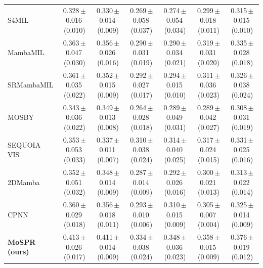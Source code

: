 \begin{tabular}{lcccccc}
S4MIL & 0.328\,{\tiny$\pm$}0.016\,{\tiny(0.010)} & 0.330\,{\tiny$\pm$}0.014\,{\tiny(0.009)} & 0.269\,{\tiny$\pm$}0.058\,{\tiny(0.037)} & 0.274\,{\tiny$\pm$}0.054\,{\tiny(0.034)} & 0.299\,{\tiny$\pm$}0.018\,{\tiny(0.011)} & 0.315\,{\tiny$\pm$}0.015\,{\tiny(0.010)}\\
MambaMIL & 0.363\,{\tiny$\pm$}0.047\,{\tiny(0.030)} & 0.356\,{\tiny$\pm$}0.026\,{\tiny(0.016)} & 0.290\,{\tiny$\pm$}0.031\,{\tiny(0.019)} & 0.290\,{\tiny$\pm$}0.034\,{\tiny(0.021)} & 0.319\,{\tiny$\pm$}0.031\,{\tiny(0.020)} & 0.335\,{\tiny$\pm$}0.028\,{\tiny(0.018)}\\
SRMambaMIL & 0.361\,{\tiny$\pm$}0.035\,{\tiny(0.022)} & 0.352\,{\tiny$\pm$}0.015\,{\tiny(0.009)} & 0.292\,{\tiny$\pm$}0.027\,{\tiny(0.017)} & 0.294\,{\tiny$\pm$}0.015\,{\tiny(0.010)} & 0.311\,{\tiny$\pm$}0.036\,{\tiny(0.023)} & 0.326\,{\tiny$\pm$}0.038\,{\tiny(0.024)}\\
MOSBY & 0.343\,{\tiny$\pm$}0.036\,{\tiny(0.022)} & 0.349\,{\tiny$\pm$}0.013\,{\tiny(0.008)} & 0.264\,{\tiny$\pm$}0.028\,{\tiny(0.018)} & 0.289\,{\tiny$\pm$}0.049\,{\tiny(0.031)} & 0.289\,{\tiny$\pm$}0.042\,{\tiny(0.027)} & 0.308\,{\tiny$\pm$}0.031\,{\tiny(0.019)}\\
SEQUOIA VIS & 0.353\,{\tiny$\pm$}0.053\,{\tiny(0.033)} & 0.337\,{\tiny$\pm$}0.011\,{\tiny(0.007)} & 0.310\,{\tiny$\pm$}0.038\,{\tiny(0.024)} & 0.314\,{\tiny$\pm$}0.040\,{\tiny(0.025)} & 0.317\,{\tiny$\pm$}0.024\,{\tiny(0.015)} & 0.331\,{\tiny$\pm$}0.025\,{\tiny(0.016)}\\
2DMamba & 0.352\,{\tiny$\pm$}0.051\,{\tiny(0.032)} & 0.348\,{\tiny$\pm$}0.014\,{\tiny(0.009)} & 0.287\,{\tiny$\pm$}0.014\,{\tiny(0.009)} & 0.292\,{\tiny$\pm$}0.026\,{\tiny(0.016)} & 0.300\,{\tiny$\pm$}0.021\,{\tiny(0.013)} & 0.313\,{\tiny$\pm$}0.022\,{\tiny(0.014)}\\
CPNN & 0.360\,{\tiny$\pm$}0.029\,{\tiny(0.018)} & 0.356\,{\tiny$\pm$}0.018\,{\tiny(0.011)} & 0.293\,{\tiny$\pm$}0.010\,{\tiny(0.006)} & 0.310\,{\tiny$\pm$}0.015\,{\tiny(0.009)} & 0.305\,{\tiny$\pm$}0.007\,{\tiny(0.004)} & 0.325\,{\tiny$\pm$}0.014\,{\tiny(0.009)}\\
\textbf{MoSPR (ours)} & 0.413\,{\tiny$\pm$}0.026\,{\tiny(0.017)} & 0.411\,{\tiny$\pm$}0.014\,{\tiny(0.009)} & 0.334\,{\tiny$\pm$}0.038\,{\tiny(0.024)} & 0.348\,{\tiny$\pm$}0.036\,{\tiny(0.023)} & 0.358\,{\tiny$\pm$}0.015\,{\tiny(0.009)} & 0.376\,{\tiny$\pm$}0.019\,{\tiny(0.012)}\\
\bottomrule
\end{tabular}
